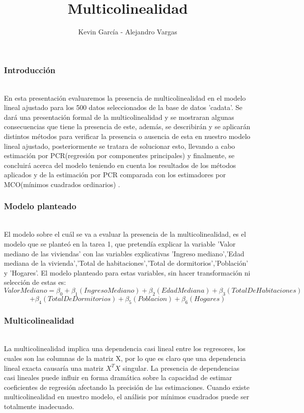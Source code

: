 \documentclass[12pt]{beamer}
\author{Kevin García - Alejandro Vargas}
\title{Multicolinealidad}
\begin{document}
\begin{frame}
\titlepage
\end{frame}

\begin{frame}
\frametitle{Introducción}
~\\ En esta presentación evaluaremos la presencia de multicolinealidad en el modelo lineal ajustado para los 500 datos seleccionados de la base de datos 'cadata'. Se dará una presentación formal de la multicolinealidad y se mostraran algunas consecuencias que tiene la presencia de este, además, se describirán y se aplicarán distintos métodos para verificar la presencia o ausencia de esta en nuestro modelo lineal ajustado, posteriormente se tratara de solucionar esto, llevando a cabo estimación por PCR(regresión por componentes principales) y finalmente, se concluirá acerca del modelo teniendo en cuenta los resultados de los métodos aplicados y de la estimación por PCR comparada con los estimadores por MCO(mínimos cuadrados ordinarios) .
\end{frame}

\begin{frame}
\frametitle{Modelo planteado}
~\\ El modelo sobre el cuál se va a evaluar la presencia de la multicolinealidad, es el modelo que se planteó en la tarea 1, que pretendía explicar la variable 'Valor mediano de las viviendas' con las variables explicativas 'Ingreso mediano','Edad mediana de la vivienda','Total de habitaciones','Total de dormitorios','Población' y 'Hogares'. El modelo planteado para estas variables, sin hacer transformación ni selección de estas es:
$$ValorMediano =\beta_{0}+\beta_{1}(IngresoMediano)+\beta_{2}(EdadMediana)+\beta_{3}(TotalDeHabitaciones)$$
$$+\beta_{4}(TotalDeDormitorios)+\beta_{5}(Poblacion)+\beta_{6}(Hogares) $$
\end{frame}

\begin{frame}
\frametitle{Multicolinealidad}
~\\La multicolinealidad implica una dependencia casi lineal entre los regresores, los cuales son las columnas de la matriz X, por lo que es claro que una dependencia lineal exacta causaría una matriz $X^{T}X$ singular. La presencia de dependencias casi lineales puede influir en forma dramática sobre la capacidad de estimar coeficientes de regresión afectando la precisión de las estimaciones. Cuando existe multicolinealidad en nuestro modelo, el análisis por mínimos cuadrados puede ser totalmente inadecuado.
\end{frame}
\end{document}
